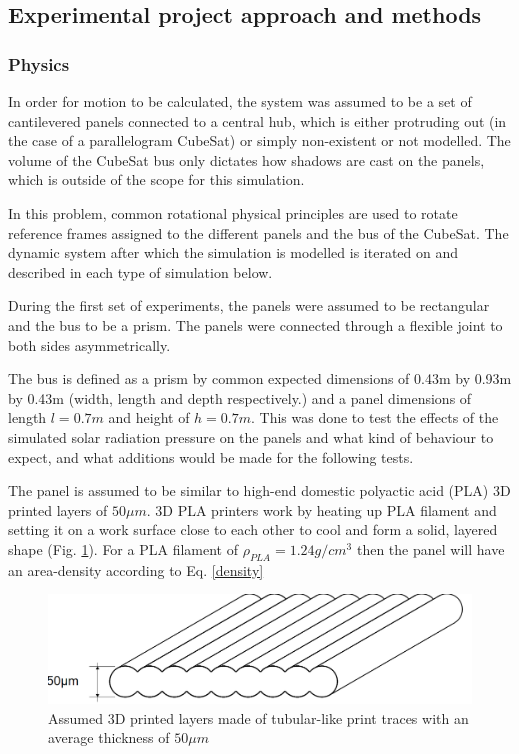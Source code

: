 \subsection{Experimental project approach and methods}\label{experimental}



\subsubsection{Physics}

In order for motion to be calculated, the system was assumed to be a set of cantilevered panels connected to a central hub, which is either protruding out (in the case of a parallelogram CubeSat) or simply non-existent or not modelled. The volume of the CubeSat bus only dictates how shadows are cast on the panels, which is outside of the scope for this simulation.

In this problem, common rotational physical principles are used to rotate reference frames assigned to the different panels and the bus of the CubeSat. The dynamic system after which the simulation is modelled is iterated on and described in each type of simulation below.

During the first set of experiments, the panels were assumed to be rectangular and the bus to be a prism. The panels were connected through a flexible joint to both sides asymmetrically.

The bus is defined as a prism by common expected dimensions of 0.43m by 0.93m by 0.43m (width, length and depth respectively.) and a panel dimensions of length $l=0.7m$ and height of $h=0.7m$. This was done to test the effects of the simulated solar radiation pressure on the panels and what kind of behaviour to expect, and what additions would be made for the following tests.

The panel is assumed to be similar to high-end domestic polyactic acid (PLA) 3D printed layers of $50\mu m$. 3D PLA printers work by heating up PLA filament and setting it on a work surface close to each other to cool and form a solid, layered shape (Fig. \ref{fig:layers}). For a PLA filament of $\rho_{PLA} = 1.24g/cm^3$ \protect\cite{pladensity} then the panel will have an area-density according to Eq. \ref{density}

\begin{center}
\begin{figure}[!htb]
    \centering
\includegraphics[width=0.7\linewidth]{layers.png} 
\caption{Assumed 3D printed layers made of tubular-like print traces with an average thickness of $50\mu m$}
  \normalsize
  \label{fig:layers}
\end{figure}
\end{center}

